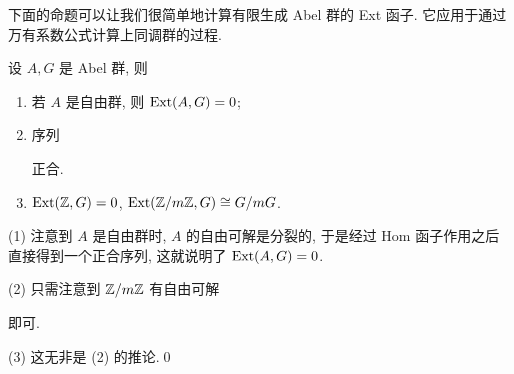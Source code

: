 下面的命题可以让我们很简单地计算有限生成 Abel 群的 Ext 函子. 它应用于通过万有系数公式计算上同调群的过程.

\begin{Proposition}
	设 $ A,G $ 是 Abel 群, 则
	\begin{enumerate}
		\item 若 $ A $ 是自由群, 则 $ \mathrm{Ext}(A,G)=0 $;
		\item 序列
		\begin{center}
		\end{center}
		正合.
		\item $ \mathrm{Ext}(\mathbb{Z},G)=0 $, $ \mathrm{Ext}(\mathbb{Z}/m\mathbb{Z},G)\cong G/mG $.
	\end{enumerate}
\end{Proposition}
\begin{Proof}
	(1) 注意到 $ A $ 是自由群时, $ A $ 的自由可解是分裂的, 于是经过 Hom 函子作用之后直接得到一个正合序列, 这就说明了 $ \mathrm{Ext}(A,G)=0 $.

	(2) 只需注意到 $ \mathbb{Z}/m\mathbb{Z} $ 有自由可解
	\begin{center}
	\end{center}
	即可.

	(3) 这无非是 (2) 的推论.\qed
\end{Proof}

